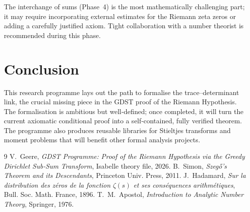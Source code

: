 \documentclass[12pt,a4paper]{article}
\begin{document}
The interchange of sums (Phase~4) is the most mathematically challenging part; 
it may require incorporating external estimates for the Riemann zeta zeros or adding 
a carefully justified axiom.  Tight collaboration with a number theorist is recommended 
during this phase.

\section{Conclusion}
This research programme lays out the path to formalise the trace–determinant link, the 
crucial missing piece in the GDST proof of the Riemann Hypothesis.  The formalisation is 
ambitious but well‑defined; once completed, it will turn the current axiomatic conditional 
proof into a self‑contained, fully verified theorem.  The programme also produces reusable 
libraries for Stieltjes transforms and moment problems that will benefit other formal 
analysis projects.

\begin{thebibliography}{9}
V.~Geere, \emph{GDST Programme: Proof of the Riemann Hypothesis via the Greedy Dirichlet 
Sub‑Sum Transform}, Isabelle theory file, 2026.
B.~Simon, \emph{Szegő's Theorem and its Descendants}, Princeton Univ. Press, 2011.
J.~Hadamard, \emph{Sur la distribution des zéros de la fonction $\zeta(s)$ et ses 
conséquences arithmétiques}, Bull. Soc. Math. France, 1896.
T.~M.~Apostol, \emph{Introduction to Analytic Number Theory}, Springer, 1976.
\end{thebibliography}
\end{document}

